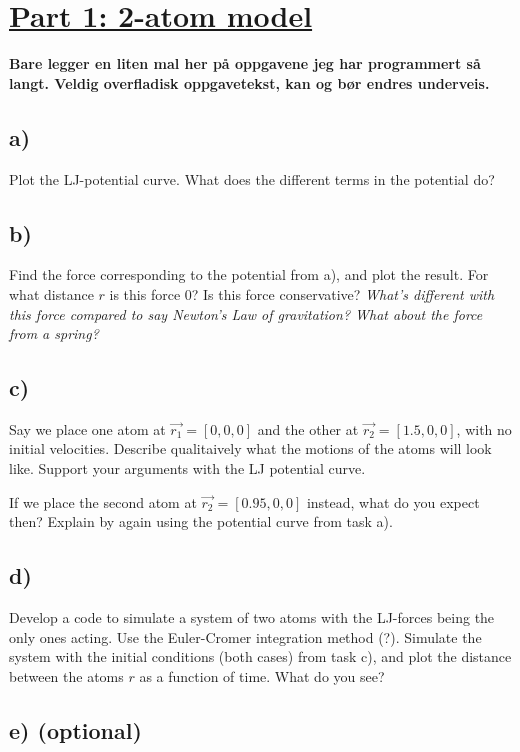 \documentclass[11pt,british,a4paper]{report}
\begin{document}
\clearpage
\section*{\underline{Part 1: 2-atom model}}

\textbf{Bare legger en liten mal her på oppgavene jeg har programmert så langt. Veldig overfladisk oppgavetekst, kan og bør endres underveis.}

\subsection*{a)}

Plot the LJ-potential curve. What does the different terms in the potential do?

\subsection*{b)}

Find the force corresponding to the potential from a), and plot the result. For what distance $r$ is this force 0? Is this force conservative? \textit{What's different with this force
compared to say Newton's Law of gravitation? What about the force from a spring?}

\subsection*{c)}

Say we place one atom at $\vec{r_1} = [0, 0, 0]$ and the other at $\vec{r_2} = [1.5, 0, 0]$, with no initial velocities. Describe qualitaively what the motions of the atoms will look like. Support your arguments with the LJ potential curve.

If we place the second atom at $\vec{r_2} = [0.95, 0, 0]$ instead, what do you expect then? Explain by again using the potential curve from task a).

\subsection*{d)}

Develop a code to simulate a system of two atoms with the LJ-forces being the only ones acting. Use the Euler-Cromer integration method (?). Simulate the system with the initial conditions
(both cases) from task c), and plot the distance between the atoms $r$ as a function of time. What do you see?

\subsection*{e) (optional)}
\end{document}
